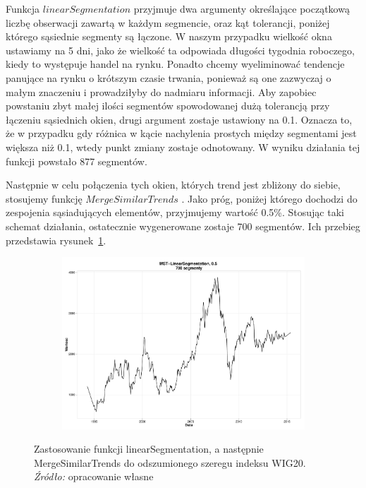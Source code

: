 \documentclass[polish, twoside, 12pt, a4paper]{article}
\theoremstyle{definition}
\theoremstyle{plain}
\theoremstyle{remark}
\begin{document}
Funkcja \(linearSegmentation\) przyjmuje dwa argumenty określające początkową liczbę obserwacji zawartą w każdym segmencie, oraz kąt tolerancji, poniżej którego sąsiednie segmenty są łączone. W naszym przypadku 
wielkość okna ustawiamy na 5 dni, jako że wielkość ta odpowiada długości tygodnia roboczego, kiedy to występuje handel na rynku. Ponadto chcemy wyeliminować tendencje panujące na rynku o krótszym czasie trwania, 
ponieważ są one zazwyczaj o małym znaczeniu i prowadziłyby do nadmiaru informacji. Aby zapobiec powstaniu zbyt małej ilości segmentów spowodowanej dużą tolerancją przy łączeniu sąsiednich okien, drugi argument 
zostaje ustawiony na 0.1\degree . Oznacza to, że w przypadku gdy różnica w kącie nachylenia prostych między segmentami jest większa niż 0.1\degree, wtedy punkt zmiany zostaje odnotowany. W wyniku działania tej funkcji powstało 
877 segmentów.

Następnie w celu połączenia tych okien, których trend jest zbliżony do siebie, stosujemy funkcję \(MergeSimilarTrends\) . Jako próg, poniżej którego dochodzi do zespojenia sąsiadujących elementów, przyjmujemy wartość 
0.5\%. Stosując taki schemat działania, ostatecznie wygenerowane zostaje 700 segmentów. Ich przebieg przedstawia rysunek~\ref{rys004}.

\begin{figure}[H]
  \centering

  \begin{subfigure}[t]{1.00\textwidth}
    \includegraphics[width=\textwidth]{./rys004}
  \end{subfigure}

  \captionsetup{margin=10pt,font=small,labelfont=bf,width=.8\textwidth}

  \caption[Zastosowanie funkcji linearSegmentation, a następnie MergeSimilarTrends]{Zastosowanie funkcji linearSegmentation, a następnie MergeSimilarTrends do odszumionego szeregu indeksu WIG20. \textit{Źródło:} opracowanie własne}\label{rys004}
\end{figure}
\end{document}
